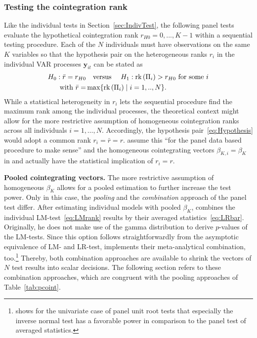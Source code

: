 \subsubsection{Testing the cointegration rank}
Like the individual tests in Section~\ref{sec:IndivTest}, the following panel tests evaluate the hypothetical cointegration rank $ r_{H0}=0,...,K-1 $ within a sequential testing procedure. Each of the $ N $ individuals must have observations on the same $ K $ variables so that the hypothesis pair on the heterogeneous ranks $ r_i $ in the individual VAR processes $ \boldsymbol{y}_{it} $ can be stated as
\begin{align} \label{eq:Hypothesis}
\begin{split}
	H_0: \bar{r} = r_{H0} & \text{\quad versus \quad} H_1: \text{rk}\left( \Pi_i \right) > r_{H0} \ \text{for some} \ i \\
	\text{with} \ \bar{r} = & \max \{ \text{rk}\left( \Pi_i \right) \mid i=1,..,N \}.
\end{split}
\end{align}
While a statistical heterogeneity in $ r_i $ lets the sequential procedure find the maximum rank among the individual processes, the theoretical context might allow for the more restrictive assumption of homogeneous cointegration ranks across all individuals $ i=1,\ldots,N$. Accordingly, the hypothesis pair~\eqref{eq:Hypothesis} would adopt a common rank $ r_i = \bar{r} = r $. \citet[p.~9]{SilvestreSurdeanu2011} assume this ``for the panel data based procedure to make sense'' and the homogeneous cointegrating vectors $ \beta_{K,i} = \beta_K $ in \citet{Breitung2005} and \citet{GroenFrank2003} actually have the statistical implication of $ r_i = r $.


\textbf{Pooled cointegrating vectors.} The more restrictive assumption of homogeneous $ \beta_K $ allows for a pooled estimation to further increase the test power. Only in this case, the \textit{pooling} and the \textit{combination} approach of the panel test differ. After estimating individual models with pooled $ \beta_K $, \citet{Breitung2005} combines the individual LM-test~\eqref{eq:LMrank} results by their averaged statistics~\eqref{eq:LRbar}. Originally, he does not make use of the gamma distribution to derive $p$-values of the LM-tests. Since this option follows straightforwardly from the asymptotic equivalence of LM- and LR-test,  implements their meta-analytical combination, too.\footnote{\citet[p.~268]{Choi2001} shows for the univariate case of panel unit root tests that especially the inverse normal test has a favorable power in comparison to the panel test of averaged statistics.} Thereby, both combination approaches are available to shrink the vectors of $ N $ test results into scalar decisions. The following section refers to these combination approaches, which are congruent with the pooling approaches of Table~\ref{tab:pcoint}.


